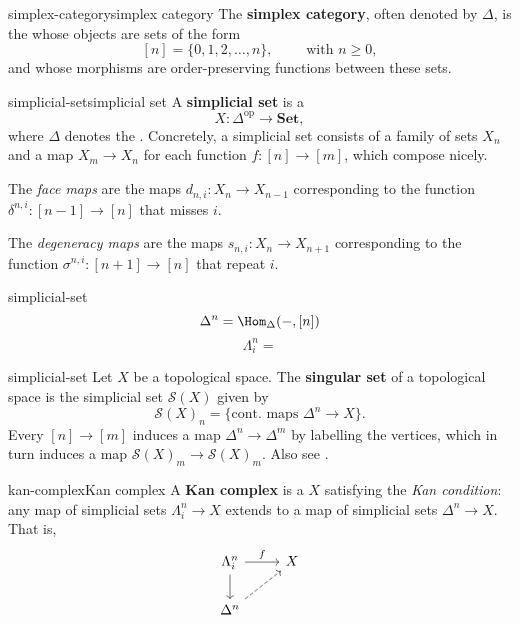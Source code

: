 \begin{topic}{simplex-category}{simplex category}
    The \textbf{simplex category}, often denoted by $\Delta$, is the  whose objects are sets of the form
    \[ [n] = \{ 0, 1, 2, \ldots, n \}, \qquad \text{ with } n \ge 0 , \]
    and whose morphisms are order-preserving functions between these sets.
\end{topic}

\begin{topic}{simplicial-set}{simplicial set}
    A \textbf{simplicial set} is a 
    \[ X : \Delta^\text{op} \to \textbf{Set} , \]
    where $\Delta$ denotes the . Concretely, a simplicial set consists of a family of sets $X_n$ and a map $X_m \to X_n$ for each function $f : [n] \to [m]$, which compose nicely.
    
    The \textit{face maps} are the maps $d_{n, i} : X_n \to X_{n - 1}$ corresponding to the function $\delta^{n, i} : [n - 1] \to [n]$ that misses $i$.
    
    The \textit{degeneracy maps} are the maps $s_{n, i} : X_n \to X_{n + 1}$ corresponding to the function $\sigma^{n, i} : [n + 1] \to [n]$ that repeat $i$.
\end{topic}

\begin{example}{simplicial-set}
    \[ \Delta^n = \Hom_\Delta(-, [n]) \]
    \[ \Lambda^n_i =  \]
\end{example}

\begin{example}{simplicial-set}
    Let $X$ be a topological space. The \textbf{singular set} of a topological space is the simplicial set $\mathcal{S}(X)$ given by
    \[ \mathcal{S}(X)_n = \{ \text{cont. maps } \Delta^n \to X \} . \]
    Every $[n] \to [m]$ induces a map $\Delta^n \to \Delta^m$ by labelling the vertices, which in turn induces a map $\mathcal{S}(X)_m \to \mathcal{S}(X)_m$. Also see .
\end{example}

\begin{topic}{kan-complex}{Kan complex}
    A \textbf{Kan complex} is a  $X$ satisfying the \textit{Kan condition}: any map of simplicial sets $\Lambda^n_i \to X$ extends to a map of simplicial sets $\Delta^n \to X$. That is,
    \[ \begin{tikzcd} \Lambda^n_i \arrow{r}{f} \arrow{d} & X \\ \Delta^n \arrow[dashed]{ur} & \end{tikzcd} \]
\end{topic}


